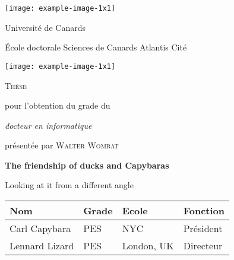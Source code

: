 \documentclass{article}
\begin{document}
\begin{titlepage}
	\centering
		\texttt{[image: example-image-1x1]}
		\hfill
		\parbox{.4\linewidth}{%
			\centering
			{\LARGE Universit\'e de Canards\par}
			\vspace{.05\textheight}
			{\large\'Ecole doctorale Sciences de Canards Atlantis Cit\'e\par}
		}
		\hfill
		\texttt{[image: example-image-1x1]}
		\par
		\vspace{.05\textheight}
		{\LARGE\scshape Th\`ese\par}
		\vspace{.05\textheight}
		pour l'obtention du grade du \par
		{\itshape\large docteur en informatique\par}
		\vspace{.05\textheight}
		pr\'esent\'ee par \textsc{Walter Wombat}\par
		\vspace{.05\textheight}
		{\Huge\bfseries The friendship of ducks and
		Capybaras\par}
		\vspace{.05\textheight}
		{\large Looking at it from a different angle\par}
		\vfill
		\noindent\begin{tabularx}{\textwidth}{XXXX}
			\toprule
			Nom            & Grade & Ecole      & Fonction \\
			\midrule
			Carl Capybara  & PES   & NYC        & Pr\'esident \\
			Lennard Lizard & PES   & London, UK & Directeur \\
			\bottomrule
		\end{tabularx}
\end{titlepage}
\end{document}
